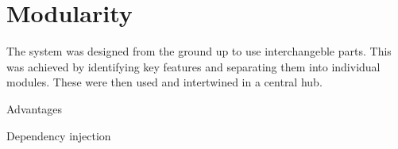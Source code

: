 
\section{Modularity}

The system was designed from the ground up to use interchangeble parts. This was achieved by identifying key features and separating them into individual modules. These were then used and intertwined in a central hub.

Advantages

Dependency injection

